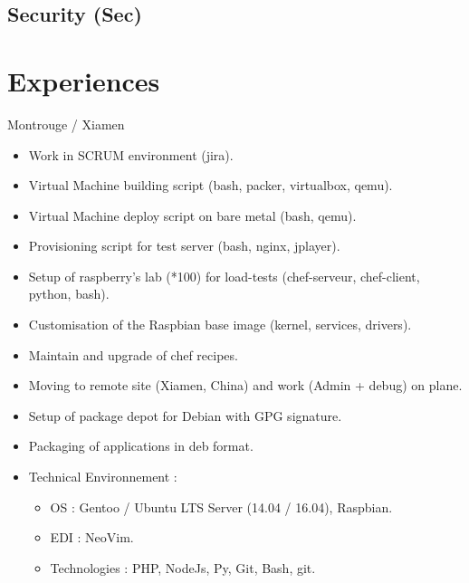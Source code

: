 \documentclass[10pt,a4paper,sans]{moderncv}
\begin{document}
\subsection{Security (Sec)}

\section{Experiences}

{Montrouge / Xiamen}{
  \begin{itemize}%
    \item Work in SCRUM environment (jira).
    \item Virtual Machine building script (bash, packer, virtualbox, qemu).
    \item Virtual Machine deploy script on bare metal (bash, qemu).
    \item Provisioning script for test server (bash, nginx, jplayer).
    \item Setup of raspberry's lab (*100) for load-tests (chef-serveur, chef-client, python, bash).
    \item Customisation of the Raspbian base image (kernel, services, drivers).
    \item Maintain and upgrade of chef recipes.
    \item Moving to remote site (Xiamen, China) and work (Admin + debug) on plane.
    \item Setup of package depot for Debian with GPG signature.
    \item Packaging of applications in deb format.
    \item Technical Environnement :
      \begin{itemize}%
        \item OS : Gentoo / Ubuntu LTS Server (14.04 / 16.04), Raspbian.
        \item EDI : NeoVim.
        \item Technologies : PHP, NodeJs, Py, Git, Bash, git.
      \end{itemize}
  \end{itemize}}
\end{document}
